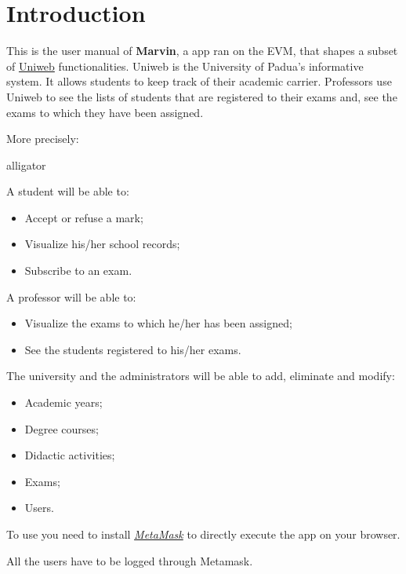 \section{Introduction}
This is the user manual of \textbf{Marvin}, a \DH app ran on the EVM, that shapes a subset of \href{www.uniweb.unipd.it}{Uniweb} functionalities. Uniweb is the University of Padua's informative system.
It allows students to keep track of their academic carrier. Professors use Uniweb to see the lists of students that are registered to their exams and, see the exams to which they have been assigned.

More precisely:
\begin{labeling}{alligator}
\item A student will be able to:
\begin{itemize}
\item Accept or refuse a mark;%
\item Visualize his/her school records;
\item Subscribe to an exam.
\end{itemize}
\item A professor will be able to:
\begin{itemize}
\item Visualize the exams to which he/her has been assigned;
\item See the students registered to his/her exams.
\end{itemize}
\item The university and the administrators will be able to add, eliminate and modify:
\begin{itemize}
\item Academic years;
\item Degree courses;
\item Didactic activities;
\item Exams;
\item Users.
\end{itemize}
\end{labeling}

To use \project{} you need to install \emph{\href{https://metamask.io/}{MetaMask}} to directly execute the \DH app on your browser.

All the users have to be logged through Metamask.